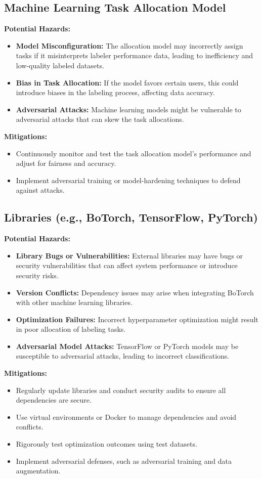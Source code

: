 \documentclass{article}
\begin{document}
\subsection{Machine Learning Task Allocation Model}
\textbf{Potential Hazards:}
\begin{itemize}
    \item \textbf{Model Misconfiguration:} The allocation model may incorrectly assign tasks if it misinterprets labeler performance data, leading to inefficiency and low-quality labeled datasets.
    \item \textbf{Bias in Task Allocation:} If the model favors certain users, this could introduce biases in the labeling process, affecting data accuracy.
    \item \textbf{Adversarial Attacks:} Machine learning models might be vulnerable to adversarial attacks that can skew the task allocations.
\end{itemize}
\textbf{Mitigations:}
\begin{itemize}
    \item Continuously monitor and test the task allocation model’s performance and adjust for fairness and accuracy.
    \item Implement adversarial training or model-hardening techniques to defend against attacks.
\end{itemize}

\subsection{Libraries (e.g., BoTorch, TensorFlow, PyTorch)}
\textbf{Potential Hazards:}
\begin{itemize}
    \item \textbf{Library Bugs or Vulnerabilities:} External libraries may have bugs or security vulnerabilities that can affect system performance or introduce security risks.
    \item \textbf{Version Conflicts:} Dependency issues may arise when integrating BoTorch with other machine learning libraries.
    \item \textbf{Optimization Failures:} Incorrect hyperparameter optimization might result in poor allocation of labeling tasks.
    \item \textbf{Adversarial Model Attacks:} TensorFlow or PyTorch models may be susceptible to adversarial attacks, leading to incorrect classifications.
\end{itemize}
\textbf{Mitigations:}
\begin{itemize}
    \item Regularly update libraries and conduct security audits to ensure all dependencies are secure.
    \item Use virtual environments or Docker to manage dependencies and avoid conflicts.
    \item Rigorously test optimization outcomes using test datasets.
    \item Implement adversarial defenses, such as adversarial training and data augmentation.
\end{itemize}
\end{document}
